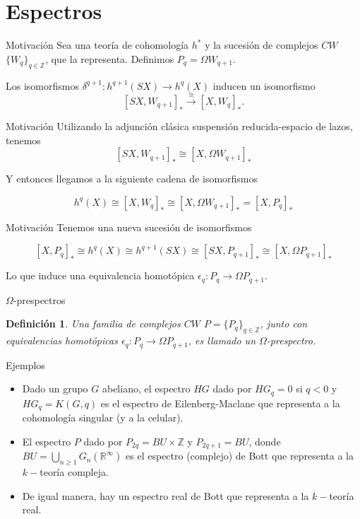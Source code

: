 \documentclass{beamer}
\newtheorem{df}{Definici\'on}
\newcommand{\Z}{\mathbb{Z}}
\newcommand{\R}{\mathbb{R}}
\begin{document}
\section{Espectros}

\begin{frame}{Motivación}
Sea una teor\'ia de cohomolog\'ia $h^{\ast}$ y la sucesi\'on de complejos $CW$ $\{W_{q}\}_{q\in\Z}$, que la representa. Definimos $P_{q}=\Omega W_{q+1}$.

Los isomorfismos $\delta^{q+1}:h^{q+1}(SX)\to h^{q}(X)$ inducen un isomorfismo 
\[[S X,W_{q+1}]_{\ast}\xrightarrow{\cong}[X,W_{q}]_{\ast}.\]
\end{frame}

\begin{frame}{Motivación}
Utilizando la adjunci\'on cl\'asica suspensi\'on reducida-espacio de lazos, tenemos 
\[[SX,W_{q+1}]_{\ast}\cong[X,\Omega W_{q+1}]_{\ast}\]

Y entonces llegamos a la siguiente cadena de isomorfismos

\[h^{q}(X)\cong[X,W_{q}]_{\ast}\cong[X,\Omega W_{q+1}]_{\ast}=[X,P_{q}]_{\ast}\]
\end{frame}

\begin{frame}{Motivación}
Tenemos una nueva sucesi\'on de isomorfismos

\[[X,P_{q}]_{\ast}\cong h^{q}(X)\cong h^{q+1}(SX)\cong[SX,P_{q+1}]_{\ast}\cong[X,\Omega P_{q+1}]_{\ast}\]

Lo que induce una equivalencia homotópica $\epsilon_{q}\colon P_{q}\to\Omega P_{q+1}$.
\end{frame}

\begin{frame}{$\Omega$-prespectros}
\begin{df}
Una familia de complejos $CW$ $P=\{P_{q}\}_{q\in\Z}$, junto con equivalencias homot\'opicas $\epsilon_{q}\colon P_{q}\to\Omega P_{q+1}$, es llamado un $\Omega$-prespectro.
\end{df}
\end{frame}

\begin{frame}{Ejemplos}
	\begin{itemize}
		\item Dado un grupo $G$ abeliano, el espectro $HG$ dado por $HG_q=0$ si $q<0$ y $HG_q = K(G,q)$ es el espectro de Eilenberg-Maclane que representa a la cohomología singular (y a la celular).
		\item El espectro $P$ dado por $P_{2q}=BU\times\Z$ y $P_{2q+1}=BU$, donde $BU=\bigcup_{n\geq1}G_n(\R^\infty)$ es el espectro (complejo) de Bott que representa a la $k-$teoría compleja.
		
		\item De igual manera, hay un espectro real de Bott que representa a la $k-$teoría real.
	\end{itemize}
\end{frame}
\end{document}
